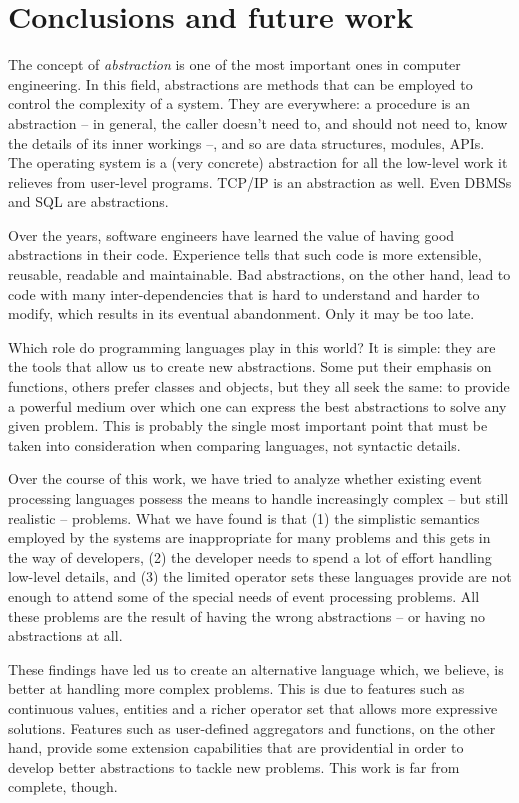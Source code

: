 \chapter{Conclusions and future work}
\label{chap:future-work}

The concept of \emph{abstraction} is one of the most important ones in
computer engineering. In this field, abstractions are methods that can
be employed to control the complexity of a system. They are
everywhere: a procedure is an abstraction -- in general, the caller
doesn't need to, and should not need to, know the details of its inner
workings --, and so are data structures, modules, APIs. The operating
system is a (very concrete) abstraction for all the low-level work it
relieves from user-level programs. TCP/IP is an abstraction as
well. Even DBMSs and SQL are abstractions.

Over the years, software engineers have learned the value of having
good abstractions in their code. Experience tells that such code is
more extensible, reusable, readable and maintainable. Bad
abstractions, on the other hand, lead to code with many
inter-dependencies that is hard to understand and harder to modify,
which results in its eventual abandonment. Only it may be too late.

Which role do programming languages play in this world? It is simple:
they are the tools that allow us to create new abstractions. Some put
their emphasis on functions, others prefer classes and objects, but
they all seek the same: to provide a powerful medium over which one
can express the best abstractions to solve any given problem. This is
probably the single most important point that must be taken into
consideration when comparing languages, not syntactic details.

Over the course of this work, we have tried to analyze whether
existing event processing languages possess the means to handle
increasingly complex -- but still realistic -- problems. What we have
found is that (1) the simplistic semantics employed by the systems are
inappropriate for many problems and this gets in the way of
developers, (2) the developer needs to spend a lot of effort handling
low-level details, and (3) the limited operator sets these languages
provide are not enough to attend some of the special needs of event
processing problems. All these problems are the result of having the
wrong abstractions -- or having no abstractions at all.

These findings have led us to create an alternative language which, we
believe, is better at handling more complex problems. This is due to
features such as continuous values, entities and a richer operator set
that allows more expressive solutions. Features such as user-defined
aggregators and functions, on the other hand, provide some extension
capabilities that are providential in order to develop better
abstractions to tackle new problems. This work is far from complete,
though.


